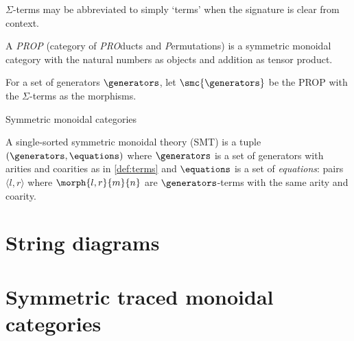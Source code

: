 \(\Sigma\)-terms may be abbreviated to simply `terms' when the signature is
clear from context.


\begin{definition}
    A \emph{PROP} (category of \emph{PRO}ducts and \emph{P}ermutations) is a
    symmetric monoidal category with the natural numbers as objects and addition
    as tensor product.
\end{definition}

\begin{definition}
    For a set of generators \(\generators\), let \(\smc{\generators}\) be the
    PROP with the \(\Sigma\)-terms as the morphisms.
\end{definition}

Symmetric monoidal categories

\begin{definition}
    A single-sorted symmetric monoidal theory (SMT) is a tuple \(
        (\generators, \equations)
    \) where \(\generators\) is a set of generators with arities and coarities
    as in \cref{def:terms} and \(\equations\) is a set of \emph{equations}:
    pairs \(\langle l, r\rangle\) where \(\morph{l, r}{m}{n}\) are
    \(\generators\)-terms with the same arity and coarity.
\end{definition}

\section{String diagrams}

\section{Symmetric traced monoidal categories}
